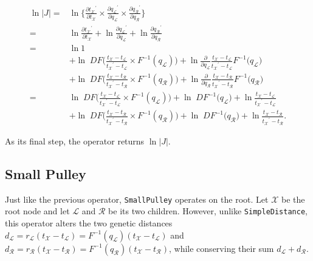 \documentclass[12pt]{article}
\begin{document}
\begin{align}
	\ln |J| =&  \ln \{ \frac{\partial {t_\mathcal{X}}^\prime}{\partial t_\mathcal{X}} \times \frac{\partial {q_\mathcal{L}}^\prime}{\partial q_\mathcal{L}} \times \frac{\partial {q_\mathcal{R}}^\prime}{\partial q_\mathcal{R}} \} \nonumber \\
			=& \ln \frac{\partial {t_\mathcal{X}}^\prime}{\partial t_\mathcal{X}} +  \ln \frac{\partial {q_\mathcal{L}}^\prime}{\partial q_\mathcal{L}} + \ln \frac{\partial {q_\mathcal{R}}^\prime}{\partial q_\mathcal{R}} \nonumber \\
			=& \ln 1  \nonumber\\
			&+ \ln \; D F\Big( \frac{t_\mathcal{X} - t_\mathcal{L}}{{t_\mathcal{X}}^\prime - t_\mathcal{L}} \times F^{-1}(q_\mathcal{L}) \Big) + \ln \frac{\partial}{\partial q_\mathcal{L}} \frac{t_\mathcal{X} - t_\mathcal{L}}{{t_\mathcal{X}}^\prime - t_\mathcal{L}} F^{-1} \Big( q_\mathcal{L} \Big) \nonumber\\
			&+ \ln \; D F\Big( \frac{t_\mathcal{X} - t_\mathcal{R}}{{t_\mathcal{X}}^\prime - t_\mathcal{R}}\times F^{-1}(q_\mathcal{R}) \Big) + \ln \frac{\partial}{\partial q_\mathcal{R}} \frac{t_\mathcal{X} - t_\mathcal{R}}{{t_\mathcal{X}}^\prime - t_\mathcal{R}} F^{-1} \Big( q_\mathcal{R} \Big) \nonumber\\
			=& \ln \; D F\Big( \frac{t_\mathcal{X} - t_\mathcal{L}}{{t_\mathcal{X}}^\prime - t_\mathcal{L}} \times F^{-1}(q_\mathcal{L}) \Big) + \ln \; D F^{-1} \Big( q_\mathcal{L} \Big) + \ln \frac{t_\mathcal{X} - t_\mathcal{L}}{{t_\mathcal{X}}^\prime - t_\mathcal{L}}\nonumber \\
			&+ \ln \; D F\Big( \frac{t_\mathcal{X} - t_\mathcal{R}}{{t_\mathcal{X}}^\prime - t_\mathcal{R}}\times F^{-1}(q_\mathcal{R}) \Big) + \ln \; D F^{-1} \Big( q_\mathcal{R} \Big) + \ln  \frac{t_\mathcal{X} - t_\mathcal{R}}{{t_\mathcal{X}}^\prime - t_\mathcal{R}}.
\end{align}


As its final step, the operator returns $\ln |J|$. 


\subsection*{Small Pulley}

Just like the previous operator, \texttt{SmallPulley} operates on the root. 
Let $\mathcal{X}$ be the root node and let $\mathcal{L}$ and $\mathcal{R}$ be its two children.
However, unlike \texttt{SimpleDistance}, this operator alters the two genetic distances $d_\mathcal{L} = r_\mathcal{L} (t_\mathcal{X} - t_\mathcal{L}) = F^{-1} (q_\mathcal{L}) (t_\mathcal{X} - t_\mathcal{L})$ and $d_\mathcal{R} = r_\mathcal{R} (t_\mathcal{X} - t_\mathcal{R}) = F^{-1} (q_\mathcal{R}) (t_\mathcal{X} - t_\mathcal{R})$, while conserving their sum $d_\mathcal{L} + d_\mathcal{R}$.
\end{document}
